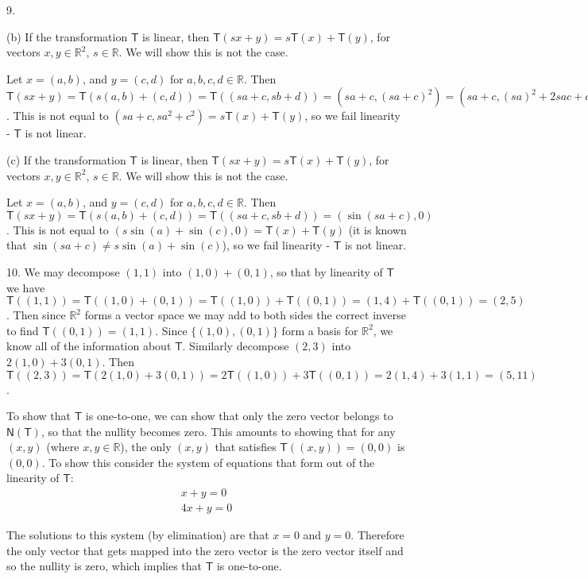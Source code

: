 \documentclass[11pt]{article}
\newcommand{\cbr}[1]{\{#1\}}
\begin{document}
9. 

(b) If the transformation $\mathsf{T}$ is linear, then $\mathsf{T}(sx+y) = s\mathsf{T}(x) + \mathsf{T}(y)$, for vectors $x,y\in\mathbb{R}^2$, $s\in\mathbb{R}$. We will show this is not the case.

Let $x = (a,b)$, and $y = (c,d)$ for $a,b,c,d\in\mathbb{R}$. Then $\mathsf{T}(sx+y) = \mathsf{T}(s(a,b)+(c,d)) = \mathsf{T}((sa+c,sb+d)) = (sa+c,(sa+c)^2) = (sa+c, (sa)^2+2sac+c^2)$. This is not equal to $(sa+c,sa^2+c^2) = s\mathsf{T}(x) + \mathsf{T}(y)$, so we fail linearity - $\mathsf{T}$ is not linear.

(c) If the transformation $\mathsf{T}$ is linear, then $\mathsf{T}(sx+y) = s\mathsf{T}(x) + \mathsf{T}(y)$, for vectors $x,y\in\mathbb{R}^2$, $s\in\mathbb{R}$. We will show this is not the case.

Let $x = (a,b)$, and $y = (c,d)$ for $a,b,c,d\in\mathbb{R}$. Then $\mathsf{T}(sx+y) = \mathsf{T}(s(a,b)+(c,d)) = \mathsf{T}((sa+c,sb+d)) = (\sin(sa+c), 0)$. This is not equal to $(s\sin(a) + \sin(c), 0) = \mathsf{T}(x) + \mathsf{T}(y)$ (it is known that $\sin(sa+c) \neq s\sin(a) + \sin(c)$), so we fail linearity - $\mathsf{T}$ is not linear.

10. We may decompose $(1,1)$ into $(1,0) + (0,1)$, so that by linearity of $\mathsf{T}$ we have $\mathsf{T}((1,1)) = \mathsf{T}((1,0) + (0,1)) = \mathsf{T}((1,0)) + \mathsf{T}((0,1)) = (1,4) + \mathsf{T}((0,1)) = (2,5)$. Then since $\mathbb{R}^2$ forms a vector space we may add to both sides the correct inverse to find $\mathsf{T}((0,1)) = (1,1)$. Since $\cbr{(1,0),(0,1)}$ form a basis for $\mathbb{R}^2$, we know all of the information about $\mathsf{T}$. Similarly decompose $(2,3)$ into $2(1,0) + 3(0,1)$. Then $\mathsf{T}((2,3)) = \mathsf{T}(2(1,0) + 3(0,1)) = 2\mathsf{T}((1,0)) + 3\mathsf{T}((0,1)) = 2(1,4) + 3(1,1) = (5,11)$.

To show that $\mathsf{T}$ is one-to-one, we can show that only the zero vector belongs to $\mathsf{N(T)}$, so that the nullity becomes zero. This amounts to showing that for any $(x,y)$ (where $x,y\in\mathbb{R}$), the only $(x,y)$ that satisfies $\mathsf{T}((x,y)) = (0,0)$ is $(0,0)$. To show this consider the system of equations that form out of the linearity of $\mathsf{T}$:
\begin{align*}
    x + y = 0 \\
    4x + y = 0
\end{align*}

The solutions to this system (by elimination) are that $x=0$ and $y=0$. Therefore the only vector that gets mapped into the zero vector is the zero vector itself and so the nullity is zero, which implies that $\mathsf{T}$ is one-to-one.
\end{document}
